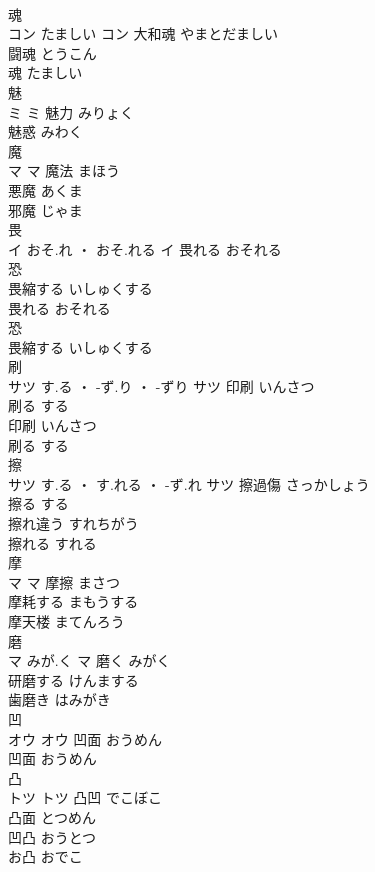 \documentclass[8pt]{extreport}
\begin{document}
\begin{CJK}{UTF8}{min}
\\	魂	
\\	コン	たましい	コン	大和魂	やまとだましい	
\\	闘魂	とうこん	
\\	魂	たましい	
\\	魅	
\\	ミ		ミ	魅力	みりょく	
\\	魅惑	みわく	
\\	魔	
\\	マ		マ	魔法	まほう	
\\	悪魔	あくま	
\\	邪魔	じゃま	
\\	畏	
\\	イ	おそ.れ ・ おそ.れる	イ	畏れる	おそれる	
\\	恐 
\\	畏縮する	いしゅくする	
\\	畏れる	おそれる	
\\	恐 
\\	畏縮する	いしゅくする	
\\	刷	
\\	サツ	す.る ・ -ず.り ・ -ずり	サツ	印刷	いんさつ	
\\	刷る	する	
\\	印刷	いんさつ	
\\	刷る	する	
\\	擦	
\\	サツ	す.る ・ す.れる ・ -ず.れ	サツ	擦過傷	さっかしょう	
\\	擦る	する	
\\	擦れ違う	すれちがう	
\\	擦れる	すれる	
\\	摩	
\\	マ		マ	摩擦	まさつ	
\\	摩耗する	まもうする	
\\	摩天楼	まてんろう	
\\	磨	
\\	マ	みが.く	マ	磨く	みがく	
\\	研磨する	けんまする	
\\	歯磨き	はみがき	
\\	凹	
\\	オウ		オウ	凹面	おうめん	
\\	凹面	おうめん	
\\	凸	
\\	トツ		トツ	凸凹	でこぼこ	
\\	凸面	とつめん	
\\	凹凸	おうとつ	
\\	お凸	おでこ	

\end{CJK}
\end{document}
